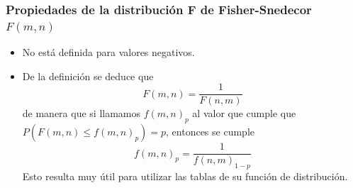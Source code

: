 \begin{frame}
\frametitle{Propiedades de la distribución F de Fisher-Snedecor $F(m,n)$}
\begin{itemize}
\item No está definida para valores negativos.
\item De la definición se deduce que
\[
F(m,n) =\frac{1}{F(n,m)}
\]
de manera que si llamamos $f(m,n)_p$ al valor que cumple que $P(F(m,n)≤f(m,n)_p)=p$, entonces se cumple
\[                                          
f(m,n)_p =\frac{1}{f(n,m)_{1−p}}
\]
Esto resulta muy útil para utilizar las tablas de su función de  distribución.
\end{itemize}

\end{frame}
